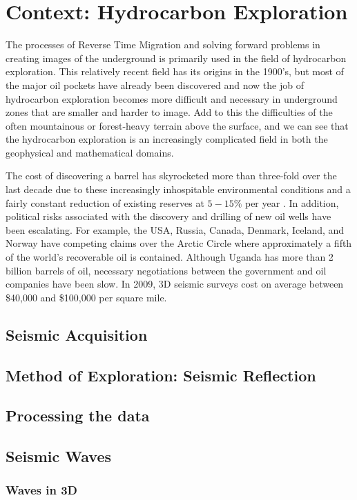 \newpage
\section{Context: Hydrocarbon Exploration}

The processes of Reverse Time Migration and solving forward problems in creating images of the underground is primarily used in the field of hydrocarbon exploration. This relatively recent field has its origins in the 1900's, but most of the major oil pockets have already been discovered and now the job of hydrocarbon exploration becomes more difficult and necessary in underground zones that are smaller and harder to image. Add to this the difficulties of the often mountainous or forest-heavy terrain above the surface, and we can see that the hydrocarbon exploration is an increasingly complicated field in both the geophysical and mathematical domains. 

The cost of discovering a barrel has skyrocketed more than three-fold over the last decade due to these increasingly inhospitable environmental conditions and a fairly constant reduction of existing reserves at $5-15\%$ per year \cite{hydrocarbonExplorationCosts}. In addition, political risks associated with the discovery and drilling of new oil wells have been escalating. For example, the USA, Russia, Canada, Denmark, Iceland, and Norway have competing claims over the Arctic Circle where approximately a fifth of the world's recoverable oil is contained. Although Uganda has more than 2 billion barrels of oil, necessary negotiations between the government and oil companies have been slow. In 2009, 3D seismic surveys cost on average between \$40,000 and \$100,000 per square mile.

\subsection{Seismic Acquisition}



\subsection{Method of Exploration: Seismic Reflection}

\subsection{Processing the data}

\subsection{Seismic Waves}

\subsubsection{Waves in 3D}



















